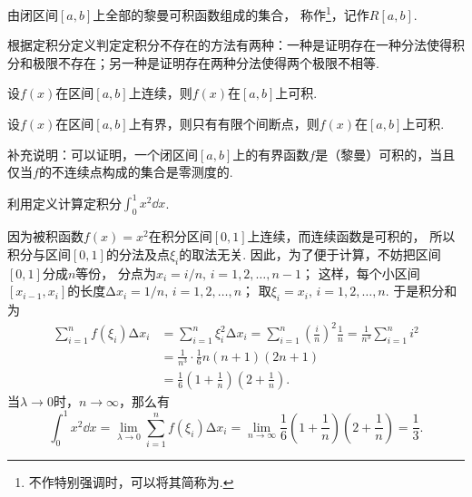 \begin{definition}\label{definition:函数族.黎曼可积函数族}
由闭区间\([a,b]\)上全部的黎曼可积函数组成的集合，
称作\footnote{%
不作特别强调时，可以将其简称为.%
}，记作\(R[a,b]\).
\end{definition}

\begin{example}[用定义法证明定积分不存在]
根据定积分定义判定定积分不存在的方法有两种：一种是证明存在一种分法使得积分和极限不存在；另一种是证明存在两种分法使得两个极限不相等.
\end{example}

\begin{theorem}[函数可积的充分条件I]
设\(f(x)\)在区间\([a,b]\)上连续，则\(f(x)\)在\([a,b]\)上可积.
\end{theorem}

\begin{theorem}[函数可积的充分条件II]
设\(f(x)\)在区间\([a,b]\)上有界，则只有有限个间断点，则\(f(x)\)在\([a,b]\)上可积.
\end{theorem}

补充说明：可以证明，一个闭区间\([a,b]\)上的有界函数\(f\)是（黎曼）可积的，当且仅当\(f\)的不连续点构成的集合是零测度的.

\begin{example}
利用定义计算定积分\(\int_0^1 x^2 \dd{x}\).
\begin{solution}
因为被积函数\(f(x) = x^2\)在积分区间\([0,1]\)上连续，而连续函数是可积的，
所以积分与区间\([0,1]\)的分法及点\(\xi_i\)的取法无关.
因此，为了便于计算，不妨把区间\([0,1]\)分成\(n\)等份，
分点为\(x_i = i/n,\,i=1,2,\dotsc,n-1\)；
这样，每个小区间\([x_{i-1},x_i]\)的长度\(\increment x_i = 1/n,\,i=1,2,\dotsc,n\)；
取\(\xi_i=x_i,\,i=1,2,\dotsc,n\).
于是积分和为\begin{align*}
	\sum_{i=1}^n f(\xi_i) \increment x_i
	&= \sum_{i=1}^n \xi_i^2 \increment x_i
	= \sum_{i=1}^n \left(\frac{i}{n}\right)^2 \frac{1}{n}
	= \frac{1}{n^3} \sum_{i=1}^n i^2 \\
	&= \frac{1}{n^3} \cdot \frac{1}{6} n(n+1)(2n+1) \\
	&= \frac{1}{6} \left(1+\frac{1}{n}\right) \left(2+\frac{1}{n}\right).
\end{align*}
当\(\lambda\to0\)时，\(n\to\infty\)，那么有\[
	\int_0^1 x^2 \dd{x}
	= \lim_{\lambda\to0} \sum_{i=1}^n f(\xi_i) \increment x_i
	= \lim_{n\to\infty}
		\frac{1}{6} \left(1+\frac{1}{n}\right) \left(2+\frac{1}{n}\right)
	= \frac{1}{3}.
\]
\end{solution}
\end{example}

